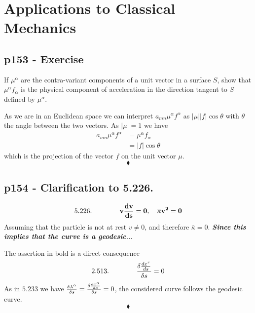 \setcounter{chapter}{4}
\chapter{Applications to Classical Mechanics}
\pagebreak[4]
\section{p153 - Exercise}
\begin{tcolorbox}
If $\mu^{\alpha}$ are the contra-variant components of a unit vector in a surface $S$, show that $\mu^{\alpha}f_{\alpha}$ is the physical component of acceleration in the direction tangent to $S$ defined by $\mu^{\alpha}$.
\end{tcolorbox}
As we are in an Euclidean space we can interpret $a_{mn}\mu^{\alpha}f^{\alpha}$ as $\left|\mu\right|\left|f\right|\cos\theta $ with $\theta$ the angle between the two vectors. As $\left|\mu\right|=1$ we have
\begin{align}
a_{mn}\mu^{\alpha}f^{\alpha}&= \mu^{\alpha}f_{\alpha}\\
&= \left|f\right|\cos\theta 
\end{align}
which is the projection of the vector $f$ on the unit vector $\mu$.
$$\blacklozenge$$
\newpage

\section{p154 - Clarification to 5.226.}
\begin{tcolorbox}
$$\mathbf{\text{5.226.}\quad\quad\quad\quad v\dv{v}{s}=0,\quad \overline{\kappa}v^2=0}$$
Assuming that the particle is not at rest $v\ne 0$, and therefore $\overline{\kappa}=0$. \textit{\textbf{Since this implies that the curve is a geodesic}...}
\end{tcolorbox}
The assertion in bold is a direct consequence $$\mathbf{\text{2.513.}}\quad\quad\quad\quad \frac{\delta \dv{x^r}{s}}{\delta s}=0$$ 
As in $ \mathbf{5.233}$ we have $\frac{\delta \lambda^{\alpha}}{\delta s}=\frac{\delta \dv{x^{\alpha}}{s}}{\delta s}=0$, the considered curve follows the geodesic curve.
$$\blacklozenge$$
\newpage

